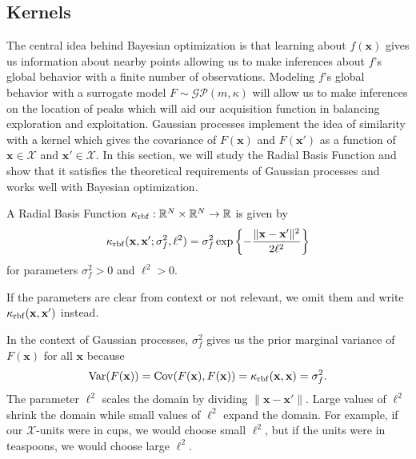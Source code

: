 \subsection{Kernels}\label{ssec:kernel}

The central idea behind Bayesian optimization is that learning about $f(\mathbf{x})$ gives us information about nearby points allowing us to make inferences about $f$'s global behavior with a finite number of observations.
Modeling $f$'s global behavior with a surrogate model $F \sim \mathcal{GP}(m, \kappa)$ will allow us to make inferences on the location of peaks which will aid our acquisition function in balancing exploration and exploitation.
Gaussian processes implement the idea of similarity with a kernel which gives the covariance of $F(\mathbf{x})$ and $F(\mathbf{x}')$ as a function of $\mathbf{x} \in \mathcal{X}$ and $\mathbf{x}' \in \mathcal{X}$.
In this section, we will study the Radial Basis Function and show that it satisfies the theoretical requirements of Gaussian processes and works well with Bayesian optimization.

\begin{definition}\label{def:rbf}
    A Radial Basis Function $\kappa_{\mathrm{rbf}}: \mathbb{R}^{N} \times \mathbb{R}^{N} \to \mathbb{R}$
    is given by
    \begin{equation}\label{eq:rbf}
        \kappa_{\mathrm{rbf}}(\mathbf{x}, \mathbf{x}'; \sigma_f^2, \ell^2)
        = \sigma_f^{2} \exp \left\{ - \frac{ \lVert \mathbf{x} - \mathbf{x}' \rVert^2 }{ 2 \ell^2 }\right\}
    \end{equation}
    for parameters $\sigma_f^2 > 0$ and $\ell^2 > 0$.

    If the parameters are clear from context or not relevant, we omit them and write $\kappa_{\mathrm{rbf}}(\mathbf{x}, \mathbf{x}')$ instead.
\end{definition}
In the context of Gaussian processes, $\sigma_f^2$ gives us the prior marginal variance of $F(\mathbf{x})$ for all $\mathbf{x}$ because
\begin{equation*}
    \operatorname{Var}(F(\mathbf{x})) = \operatorname{Cov}(F(\mathbf{x}), F(\mathbf{x})) = \kappa_{\mathrm{rbf}}(\mathbf{x}, \mathbf{x}) = \sigma_f^2.
\end{equation*}
The parameter $\ell^2$ scales the domain by dividing $\lVert \mathbf{x} - \mathbf{x}' \rVert$.
Large values of $\ell^2$ shrink the domain while small values of $\ell^2$ expand the domain.
For example, if our $\mathcal{X}$-units were in cups, we would choose small $\ell^2$, but if the units were in teaspoons, we would choose large $\ell^2$.

